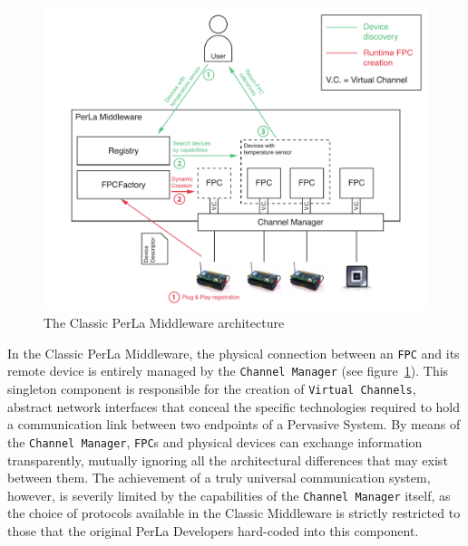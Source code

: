 \begin{figure}[h!]
\includegraphics[width=\textwidth]{imgs/classic_middleware_overview.pdf}
\caption{The Classic PerLa Middleware architecture}
\label{fig:classic_architecture}
\end{figure}

In the Classic PerLa Middleware, the physical connection between an
\texttt{FPC} and its remote device is entirely managed by the \texttt{Channel
Manager} (see figure~\ref{fig:classic_architecture}). This singleton component
is responsible for the creation of \texttt{Virtual Channels}, abstract network
interfaces that conceal the specific technologies required to hold a
communication link between two endpoints of a Pervasive System. By means of the
\texttt{Channel Manager}, \texttt{FPC}s and physical devices can exchange
information transparently, mutually ignoring all the architectural differences
that may exist between them. The achievement of a truly universal communication
system, however, is severily limited by the capabilities of the \texttt{Channel
Manager} itself, as the choice of protocols available in the Classic Middleware
is strictly restricted to those that the original PerLa Developers hard-coded
into this component.

